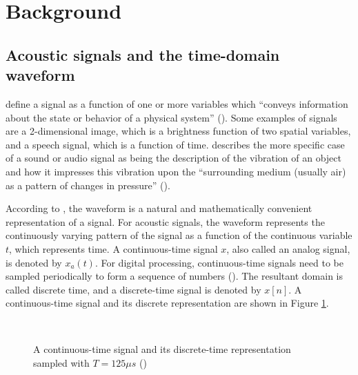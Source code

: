 \documentclass[report.tex]{subfiles}
\begin{document}
\section{Background}
\label{sec:background}

\subsection{Acoustic signals and the time-domain waveform}
\label{sec:timedomain}

\citeauthor{discretebook} define a signal as a function of one or more variables which ``conveys information about the state or behavior of a physical system'' (\cite[8]{discretebook}). Some examples of signals are a 2-dimensional image, which is a brightness function of two spatial variables, and a speech signal, which is a function of time. \citeauthor{moore} describes the more specific case of a sound or audio signal as being the description of the vibration of an object and how it impresses this vibration upon the ``surrounding medium (usually air) as a pattern of changes in pressure'' (\cite[2]{moore}).

According to \textcite{melbook}, the waveform is a natural and mathematically convenient representation of a signal. For acoustic signals, the waveform represents the continuously varying pattern of the signal as a function of the continuous variable $t$, which represents time. A continuous-time signal $x$, also called an analog signal, is denoted by $x_{a}(t)$. For digital processing, continuous-time signals need to be sampled periodically to form a sequence of numbers (\cite{discretebook}). The resultant domain is called discrete time, and a discrete-time signal is denoted by $x[n]$.  A continuous-time signal and its discrete representation are shown in Figure \ref{fig:discretecontinuous}.

\begin{figure}[ht]
	\centering
	\\
	\caption{A continuous-time signal and its discrete-time representation sampled with $T = 125\mu s$ (\cite[10]{discretebook})}
	\label{fig:discretecontinuous}
\end{figure}
\end{document}
